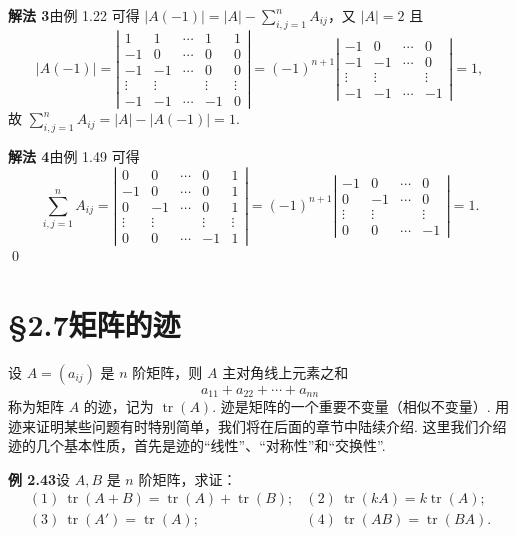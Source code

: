 \documentclass[UTF8, 12pt, fontset=fandol, oneside]{ctexart}
\begin{document}
\noindent\textbf{解法 3}\quad 由例 1.22 可得 $|A(-1)|=|A|-\sum\limits_{i,j=1}^n A_{ij}$，又 $|A|=2$ 且
\[
|A(-1)|=
\left|
\begin{array}{ccccc}
1 & 1 & \cdots & 1 & 1\\
-1 & 0 & \cdots & 0 & 0\\
-1 & -1 & \cdots & 0 & 0\\
\vdots & \vdots & & \vdots & \vdots\\
-1 & -1 & \cdots & -1 & 0
\end{array}
\right|
=(-1)^{n+1}
\left|
\begin{array}{cccc}
-1 & 0 & \cdots & 0\\
-1 & -1 & \cdots & 0\\
\vdots & \vdots & & \vdots\\
-1 & -1 & \cdots & -1
\end{array}
\right|
=1,
\]
故 $\sum\limits_{i,j=1}^n A_{ij}=|A|-|A(-1)|=1$.

\noindent\textbf{解法 4}\quad 由例 1.49 可得
\[
\sum_{i,j=1}^n A_{ij}=
\left|
\begin{array}{ccccc}
0 & 0 & \cdots & 0 & 1\\
-1 & 0 & \cdots & 0 & 1\\
0 & -1 & \cdots & 0 & 1\\
\vdots & \vdots & & \vdots & \vdots\\
0 & 0 & \cdots & -1 & 1
\end{array}
\right|
=(-1)^{n+1}
\left|
\begin{array}{cccc}
-1 & 0 & \cdots & 0\\
0 & -1 & \cdots & 0\\
\vdots & \vdots & & \vdots\\
0 & 0 & \cdots & -1
\end{array}
\right|
=1.
\]
\qed

\section*{§2.7\quad 矩阵的迹}

设 $A=(a_{ij})$ 是 $n$ 阶矩阵，则 $A$ 主对角线上元素之和
\[
a_{11}+a_{22}+\cdots+a_{nn}
\]
称为矩阵 $A$ 的迹，记为 $\operatorname{tr}(A)$. 迹是矩阵的一个重要不变量（相似不变量）. 用迹来证明某些问题有时特别简单，我们将在后面的章节中陆续介绍. 这里我们介绍迹的几个基本性质，首先是迹的“线性”、“对称性”和“交换性”.

\noindent\textbf{例 2.43}\quad 设 $A,B$ 是 $n$ 阶矩阵，求证：
\[
\begin{array}{ll}
(1)\ \operatorname{tr}(A+B)=\operatorname{tr}(A)+\operatorname{tr}(B); &
(2)\ \operatorname{tr}(kA)=k\operatorname{tr}(A);\\
(3)\ \operatorname{tr}(A')=\operatorname{tr}(A); &
(4)\ \operatorname{tr}(AB)=\operatorname{tr}(BA).
\end{array}
\]
\end{document}
